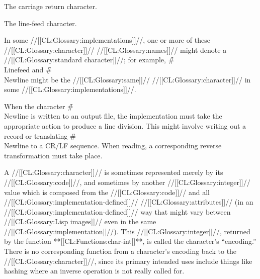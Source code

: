 
The carriage return character.



The line-feed character.
\endlist

In some //[[CL:Glossary:implementations]]//,
one or more of these //[[CL:Glossary:character]]// //[[CL:Glossary:names]]// 
might denote a //[[CL:Glossary:standard character]]//; 
for example,
\f{\#\\Linefeed} and \f{\#\\Newline} might be the //[[CL:Glossary:same]]// //[[CL:Glossary:character]]//
in some //[[CL:Glossary:implementations]]//.


\endsubsection%



When the character \f{\#\\Newline} is written to an output file,
the implementation must take the appropriate action
to produce a line division.  This might involve writing out a
record or translating \f{\#\\Newline} to a CR/LF sequence.
When reading, a corresponding reverse transformation must take place.

\endsubSection%





A //[[CL:Glossary:character]]// is sometimes represented merely by its //[[CL:Glossary:code]]//, and sometimes
by another //[[CL:Glossary:integer]]// value which is composed from the //[[CL:Glossary:code]]// and all 
//[[CL:Glossary:implementation-defined]]// //[[CL:Glossary:attributes]]//
(in an //[[CL:Glossary:implementation-defined]]// way
that might vary between //[[CL:Glossary:Lisp images]]// even in the same //[[CL:Glossary:implementation]]//).
This //[[CL:Glossary:integer]]//, returned by the function **[[CL:Functions:char-int]]**, is called the
character's ``encoding.''
There is no corresponding function
from a character's encoding back to the //[[CL:Glossary:character]]//, 
since its primary intended uses include things like hashing where an inverse operation
is not really called for.


\endsubSection%

